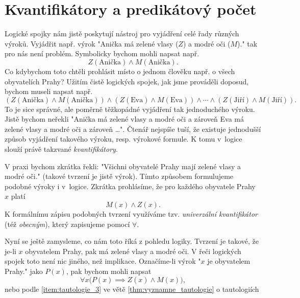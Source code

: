 \section{Kvantifikátory a predikátový počet}\label{sec:kvantifikatory_a_pred_pocet}

Logické spojky nám jistě poskytují nástroj pro vyjádření celé řady různých výroků. Vyjádřit např. výrok "Anička má zelené vlasy ($Z$) a modré oči ($M$)." tak pro nás není problém. Symbolicky bychom mohli napsat např.
\begin{equation*}
    Z({\text{Anička}}) \land M({\text{Anička}}).
\end{equation*}
Co kdybychom toto chtěli prohlásit místo o jednom člověku např. o všech obyvatelích Prahy? Užitím čistě logických spojek, jak jsme prováděli doposud, bychom museli napsat např.
\begin{equation*}
    (Z({\text{Anička}}) \land M({\text{Anička}})) \land (Z({\text{Eva}}) \land M({\text{Eva}})) \land \cdots \land (Z({\text{Jiří}}) \land M({\text{Jiří}})).
\end{equation*}
To je sice správné, ale poměrně těžkopádné vyjádření tak jednoduchého výroku. Jistě bychom neřekli "Anička má zelené vlasy a modré oči a zároveň Eva má zelené vlasy a modré oči a zároveň \dots". Čtenář nejspíše tuší, že existuje jednodušší způsob vyjádření takového výroku, resp. výrokové formule. K tomu v~logice slouží právě takzvané \emph{kvantifikátory}.\par
V praxi bychom zkrátka řekli: "Všichni obyvatelé Prahy mají zelené vlasy a modré oči." (takové tvrzení je jistě výrok). Tímto způsobem formulujeme podobné výroky i v~logice. Zkrátka prohlásíme, že pro každého obyvatele Prahy $x$ platí
\begin{equation*}
    M(x) \land Z(x).
\end{equation*}
K formálnímu zápisu podobných tvrzení využíváme tzv. \emph{univerzální kvantifikátor} (též \emph{obecným}), který zapisujeme pomocí $\forall$.\par
Nyní se ještě zamysleme, co nám toto říká z pohledu logiky. Tvrzení je takové, že je-li $x$ obyvatelem Prahy, pak má zelené vlasy a modré oči. V řeči logických spojek toto není nic jiného, než implikace. Označíme-li výrok "$x$ je obyvatelem Prahy." jako $P(x)$, pak bychom mohli napsat
\begin{equation}\label{eq:univ_kvatifikator_priklad}
    \forall x \bigl(P(x) \implies Z(x) \land M(x)\bigr),
\end{equation}
nebo podle \ref{item:tautologie_3} ve větě \ref{thm:vyznamne_tautologie} o tautologiích
